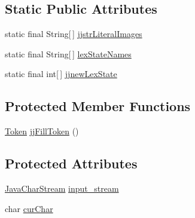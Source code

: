 \subsection*{Static Public Attributes}
\begin{DoxyCompactItemize}
\item 
static final String\mbox{[}$\,$\mbox{]} \hyperlink{classorg_1_1coode_1_1owlapi_1_1functionalparser_1_1_o_w_l_functional_syntax_parser_token_manager_aa5e0f1069a6b0d2d65e44c9fb56168df}{jjstr\-Literal\-Images}
\item 
static final String\mbox{[}$\,$\mbox{]} \hyperlink{classorg_1_1coode_1_1owlapi_1_1functionalparser_1_1_o_w_l_functional_syntax_parser_token_manager_abbcb1479fa6cc2f6edfbd5caf3042d75}{lex\-State\-Names}
\item 
static final int\mbox{[}$\,$\mbox{]} \hyperlink{classorg_1_1coode_1_1owlapi_1_1functionalparser_1_1_o_w_l_functional_syntax_parser_token_manager_a5534edaab674779ff1383d20f034142b}{jjnew\-Lex\-State}
\end{DoxyCompactItemize}
\subsection*{Protected Member Functions}
\begin{DoxyCompactItemize}
\item 
\hyperlink{classorg_1_1coode_1_1owlapi_1_1functionalparser_1_1_token}{Token} \hyperlink{classorg_1_1coode_1_1owlapi_1_1functionalparser_1_1_o_w_l_functional_syntax_parser_token_manager_ac3c025a9ba6b1568055b5fbba018734a}{jj\-Fill\-Token} ()
\end{DoxyCompactItemize}
\subsection*{Protected Attributes}
\begin{DoxyCompactItemize}
\item 
\hyperlink{classorg_1_1coode_1_1owlapi_1_1functionalparser_1_1_java_char_stream}{Java\-Char\-Stream} \hyperlink{classorg_1_1coode_1_1owlapi_1_1functionalparser_1_1_o_w_l_functional_syntax_parser_token_manager_a086cef9a2411c7e7f5cb6a8b1b10b826}{input\-\_\-stream}
\item 
char \hyperlink{classorg_1_1coode_1_1owlapi_1_1functionalparser_1_1_o_w_l_functional_syntax_parser_token_manager_a403ae4332b19bd838d518d9d62d42cf2}{cur\-Char}
\end{DoxyCompactItemize}

